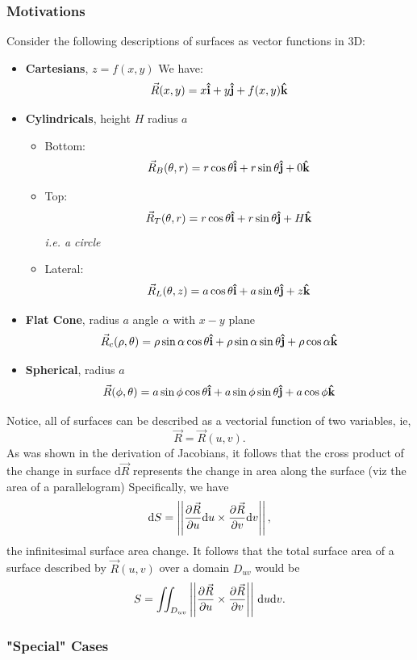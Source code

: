 \documentclass[12pt]{article}
\begin{document}
{\subsubsection{Motivations}
Consider the following descriptions of surfaces as vector functions in 3D:
\begin{itemize}
    \item \textbf{Cartesians}, $z = f(x,y)$
    We have: \[\vec{R}(x,y) = x \vu{i} + y \vu{j} + f(x,y)\vu{k}\]
    \item \textbf{Cylindricals}, height $H$ radius $a$
    \begin{itemize}
        \item Bottom:
        \[\vec{R}_B(\theta, r) = r \cos \theta \vu{i} + r \sin\theta \vu{j} + 0 \vu{k}\]
        \item Top:
        \[\vec{R}_T(\theta, r) = r \cos \theta \vu{i} + r \sin\theta \vu{j} + H \vu{k}\]
        \textit{i.e. a circle}
        \item Lateral: 
        \[\vec{R}_L(\theta, z) = a \cos \theta \vu{i} + a \sin \theta \vu{j} + z \vu{k}\]
    \end{itemize}
    \item \textbf{Flat Cone}, radius $a$ angle $\alpha$ with $x-y$ plane
    \[\vec{R}_c(\rho, \theta) = \rho \sin \alpha \cos \theta \vu{i} + \rho \sin \alpha \sin \theta \vu{j} + \rho \cos \alpha \vu{k}\]
    \item \textbf{Spherical}, radius $a$
    \[\vec{R}(\phi, \theta) = a \sin \phi \cos \theta \vu{i} + a \sin \phi \sin \theta \vu{j} + a \cos \phi \vu{k}\]
\end{itemize}

Notice, all of surfaces can be described as a vectorial function of two variables, ie, \[\vec{R} = \vec{R}(u,v).\] As was shown in the derivation of Jacobians, it follows that the cross product of the change in surface $\text{d}\vec{R}$ represents the change in area along the surface (viz the area of a parallelogram) Specifically, we have \[\text{d}S = \left|\left| \frac{\partial \vec{R}}{\partial u}\text{d}u \times \frac{\partial \vec{R}}{\partial v}\text{d}v \right|\right|,\] the infinitesimal surface area change. It follows that the total surface area of a surface described by $\vec{R}(u,v)$ over a domain $D_{uv}$ would be \[S = \iint_{D_{uv}} \left|\left| \frac{\partial \vec{R}}{\partial u} \times \frac{\partial \vec{R}}{\partial v}\right|\right| \, \text{d}u\text{d}v.\]

\subsubsection{"Special" Cases}

}
\end{document}
